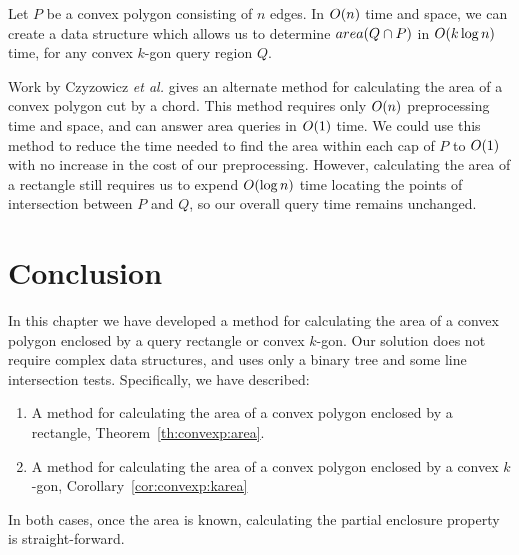 \begin{corollary}
\label{cor:convexp:karea}
Let $P$ be a convex polygon consisting of $n$ edges. In $O\!\left(n\right)$ time and space, we can create a data structure which allows us to determine $area(Q \cap P)$ in $O\!\left(k \log{n}\right)$ time, for any convex $k$-gon query region $Q$.
\end{corollary}

Work by Czyzowicz \textit{et al.}\cite{DBLP:conf/cccg/CzyzowiczCU98} gives an alternate method for calculating the area of a convex polygon cut by a chord.  This method requires only $O\!\left(n\right)$ preprocessing time and space, and can answer area queries in $O\!\left(1\right)$ time. We could use this method to reduce the time needed to find the area within each cap of $P$ to $O\!\left(1\right)$ with no increase in the cost of our preprocessing. However, calculating the area of a rectangle still requires us to expend $O\!\left(\log{n}\right)$ time locating the points of intersection between $P$ and $Q$, so our overall query time remains unchanged.


\section{Conclusion}
\label{:convexp:concl}

In this chapter we have developed a method for calculating the area of a convex polygon enclosed by a query rectangle or convex $k$-gon. 
Our solution does not require complex data structures, and uses only a binary tree and some line intersection tests.
Specifically, we have described:

\begin{enumerate}
\item A method for calculating the area of a convex polygon enclosed by a rectangle, Theorem~\ref{th:convexp:area}.

\item A method for calculating the area of a convex polygon enclosed by a convex $k$-gon, Corollary~\ref{cor:convexp:karea}
\end{enumerate}

In both cases, once the area is known, calculating the partial enclosure property is straight-forward.
